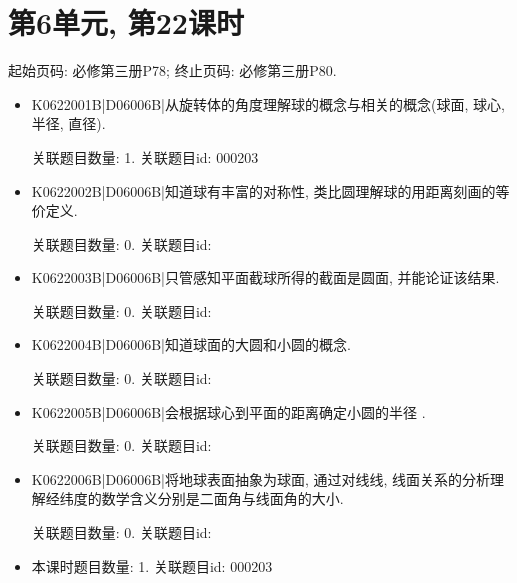 \section*{第6单元, 第22课时}
起始页码: 必修第三册P78; 终止页码: 必修第三册P80.
\begin{itemize}
\item K0622001B|D06006B|从旋转体的角度理解球的概念与相关的概念(球面, 球心, 半径, 直径).

关联题目数量: 1. 关联题目id: 000203

\item K0622002B|D06006B|知道球有丰富的对称性, 类比圆理解球的用距离刻画的等价定义.

关联题目数量: 0. 关联题目id: 

\item K0622003B|D06006B|只管感知平面截球所得的截面是圆面, 并能论证该结果.

关联题目数量: 0. 关联题目id: 

\item K0622004B|D06006B|知道球面的大圆和小圆的概念.

关联题目数量: 0. 关联题目id: 

\item K0622005B|D06006B|会根据球心到平面的距离确定小圆的半径 .

关联题目数量: 0. 关联题目id: 

\item K0622006B|D06006B|将地球表面抽象为球面, 通过对线线, 线面关系的分析理解经纬度的数学含义分别是二面角与线面角的大小.

关联题目数量: 0. 关联题目id: 

\item 本课时题目数量: 1. 关联题目id: 000203

\end{itemize}

